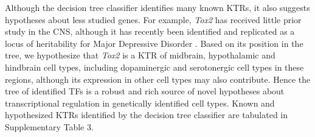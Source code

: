 Although the decision tree classifier identifies many known KTRs, it also suggests hypotheses about less studied genes. For example, \textit{Tox2} has received little prior study in the CNS, although it has recently been identified and replicated as a locus of heritability for Major Depressive Disorder \citep{Zeng_2016}. Based on its position in the tree, we hypothesize that \textit{Tox2} is a KTR of midbrain, hypothalamic and hindbrain cell types, including dopaminergic and serotonergic cell types in these regions, although its expression in other cell types may also contribute. Hence the tree of identified TFs is a robust and rich source of novel hypotheses about transcriptional regulation in genetically identified cell types. Known and hypothesized KTRs identified by the decision tree classifier are tabulated in Supplementary Table 3.


